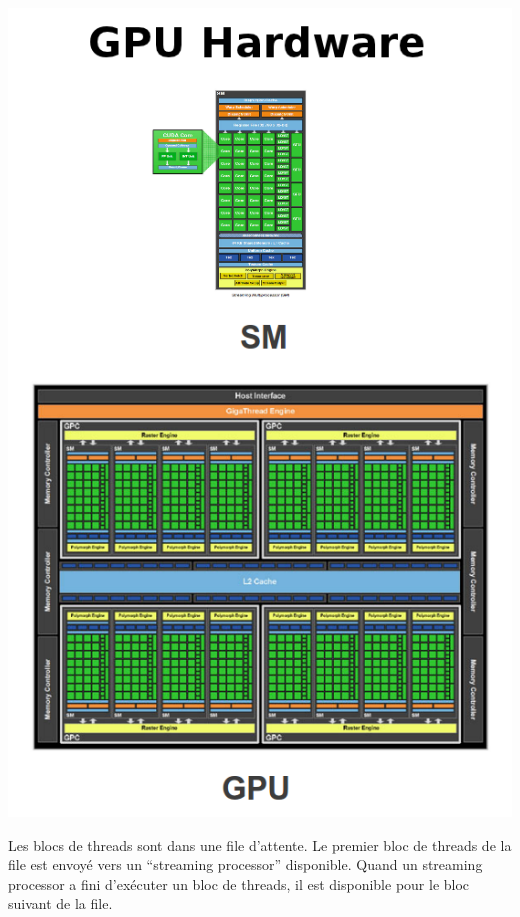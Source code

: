 \documentclass[usenames,dvipsnames]{beamer}
\begin{document}
\begin{frame}
\begin{center}
\includegraphics[scale=0.7]{../../Images/HardGPU}
\end{center}

	Les blocs de threads sont dans une file d'attente. Le premier bloc de threads de la file est envoyé vers un ``streaming processor'' disponible. Quand un streaming processor a fini d'exécuter un bloc de threads, il est disponible pour le bloc suivant de la file.
\end{frame}
\end{document}
